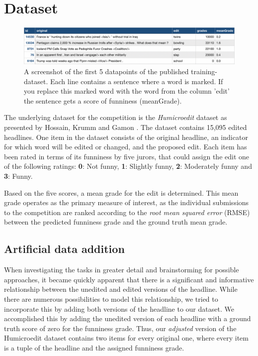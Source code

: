 \documentclass[11pt,a4paper]{article}
\begin{document}
\section{Dataset}
\begin{figure}[ht]
	\centering
    \includegraphics[width=1\textwidth, angle=0]{imgs/dataset-train.png}
	\caption{A screenshot of the first 5 datapoints of the published training-dataset. Each line contains a sentence where a word is marked. If you replace this marked word with the word from the column 'edit' the sentence gets a score of funniness (meanGrade).}
	\label{fig1}
\end{figure}

The underlying dataset for the competition is the \textit{Humicroedit} dataset as presented by Hossain, Krumm and Gamon \cite{hossain-etal-2019-president}. The dataset contains 15,095 edited headlines. One item in the dataset consists of the original headline, an indicator for which word will be edited or changed, and the proposed edit. Each item has been rated in terms of its funniness by five jurors, that could assign the edit one of the following ratings: \textbf{0}: Not funny, \textbf{1}: Slightly funny, \textbf{2}: Moderately funny and \textbf{3}: Funny. 

Based on the five scores, a mean grade for the edit is determined. This mean grade operates as the primary measure of interest, as the individual submissions to the competition are ranked according to the \textit{root mean squared error} (RMSE) between the predicted funniness grade and the ground truth mean grade.

\subsection{Artificial data addition}\label{sec:data_gen}
When investigating the tasks in greater detail and brainstorming for possible approaches, it became quickly apparent that there is a significant and informative relationship between the unedited and edited versions of the headline. While there are numerous possibilities to model this relationship, we tried to incorporate this by adding both versions of the headline to our dataset. We accomplished this by adding the unedited version of each headline with a ground truth score of zero for the funniness grade. Thus, our \textit{adjusted} version of the Humicroedit dataset contains two items for every original one, where every item is a  tuple of the headline and the assigned funniness grade. 
\end{document}
